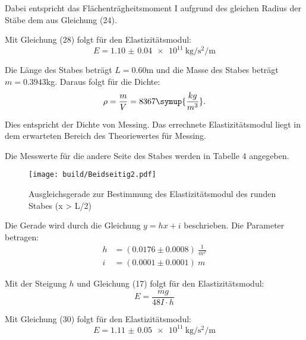 Dabei entspricht das Flächenträgheitsmoment I aufgrund des gleichen Radius der Stäbe
dem aus Gleichung (24).

Mit Gleichung (28) folgt für den Elastizitätsmodul:
\begin{equation}
  E = \SI{1.10(4)e11}{\kilo\gram\per\second\squared\per\meter}
\end{equation}

Die Länge des Stabes beträgt $L = 0.60$m und die Masse des Stabes beträgt $m = 0.3943$kg.
Daraus folgt für die Dichte:
\begin{equation}
  \rho = \frac{m}{V} = 8367 \symup{\frac{kg}{m^3}} .
\end{equation}

Dies entspricht der Dichte von Messing. Das errechnete Elastizitätsmodul liegt in dem
erwarteten Bereich des Theoriewertes für Messing.

Die Messwerte für die andere Seite des Stabes werden in Tabelle 4 angegeben.



\begin{figure}[H]
  \centering
  \texttt{[image: build/Beidseitig2.pdf]}
  \caption{Ausgleichsgerade zur Bestimmung des Elastizitätsmodul des runden Stabes (x > L/2)}
  \label{fig:Elastizitätsmodul des runden Stabes1}
\end{figure}

Die Gerade wird durch die Gleichung $y = hx + i$ beschrieben. Die Parameter betragen:
\begin{align*}
  h &= (0.0176 \pm 0.0008) \: \frac{1}{m^2} \\
  i &= (0.0001  \pm 0.0001) \: m
\end{align*}

Mit der Steigung $h$ und Gleichung (17) folgt für den Elastizitätsmodul:
\begin{equation}
  E = \frac{mg}{48I \cdot h}
\end{equation}


Mit Gleichung (30) folgt für den Elastizitätsmodul:
\begin{equation}
  E = \SI{1.11(5)e11}{\kilo\gram\per\second\squared\per\meter}
\end{equation}
